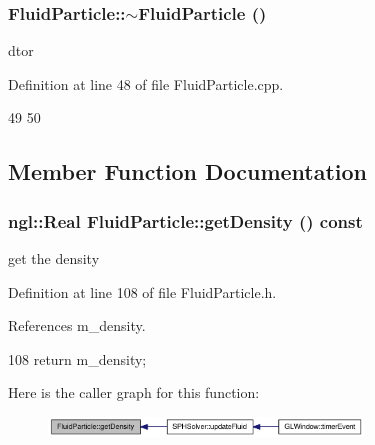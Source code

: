 \hypertarget{class_fluid_particle_a5b00e708cb5123c8883b67168488da09}{
\subsubsection[{$\sim$FluidParticle}]{\setlength{\rightskip}{0pt plus 5cm}FluidParticle::$\sim$FluidParticle ()}}
\label{class_fluid_particle_a5b00e708cb5123c8883b67168488da09}


dtor 



Definition at line 48 of file FluidParticle.cpp.




\begin{DoxyCode}
49 {
50 }
\end{DoxyCode}




\subsection{Member Function Documentation}
\hypertarget{class_fluid_particle_ae46a808efdc6e4132ee84564fb644fab}{
\subsubsection[{getDensity}]{\setlength{\rightskip}{0pt plus 5cm}ngl::Real FluidParticle::getDensity () const}}
\label{class_fluid_particle_ae46a808efdc6e4132ee84564fb644fab}


get the density 



Definition at line 108 of file FluidParticle.h.



References m\_\-density.




\begin{DoxyCode}
108 { return m_density; }
\end{DoxyCode}




Here is the caller graph for this function:\nopagebreak
\begin{figure}[H]
\begin{center}
\leavevmode
\includegraphics[width=237pt]{class_fluid_particle_ae46a808efdc6e4132ee84564fb644fab_icgraph}
\end{center}
\end{figure}


